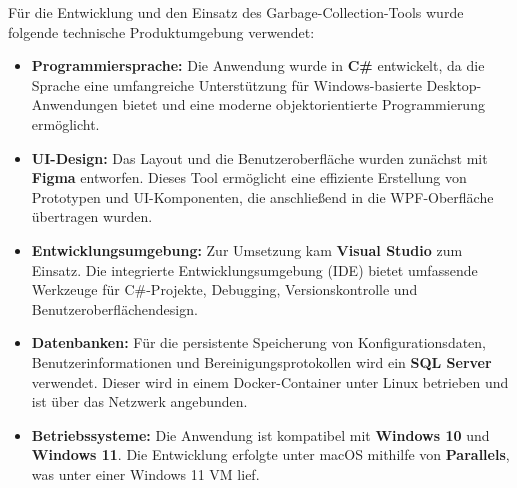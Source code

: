 

Für die Entwicklung und den Einsatz des Garbage-Collection-Tools wurde folgende technische Produktumgebung verwendet:

\begin{itemize} \item \textbf{Programmiersprache:}
Die Anwendung wurde in \textbf{C\#} entwickelt, da die Sprache eine umfangreiche Unterstützung für Windows-basierte Desktop-Anwendungen bietet und eine moderne objektorientierte Programmierung ermöglicht.

\item \textbf{UI-Design:}
Das Layout und die Benutzeroberfläche wurden zunächst mit \textbf{Figma} entworfen. Dieses Tool ermöglicht eine effiziente Erstellung von Prototypen und UI-Komponenten, die anschließend in die WPF-Oberfläche übertragen wurden.

\item \textbf{Entwicklungsumgebung:}
Zur Umsetzung kam \textbf{Visual Studio} zum Einsatz. Die integrierte Entwicklungsumgebung (IDE) bietet umfassende Werkzeuge für C\#-Projekte, Debugging, Versionskontrolle und Benutzeroberflächendesign.

\item \textbf{Datenbanken:}
Für die persistente Speicherung von Konfigurationsdaten, Benutzerinformationen und Bereinigungsprotokollen wird ein \textbf{SQL Server} verwendet. Dieser wird in einem Docker-Container unter Linux betrieben und ist über das Netzwerk angebunden.

\item \textbf{Betriebssysteme:}
Die Anwendung ist kompatibel mit \textbf{Windows 10} und \textbf{Windows 11}. Die Entwicklung erfolgte unter macOS mithilfe von \textbf{Parallels}, was unter einer Windows 11 VM lief.

 \end{itemize}